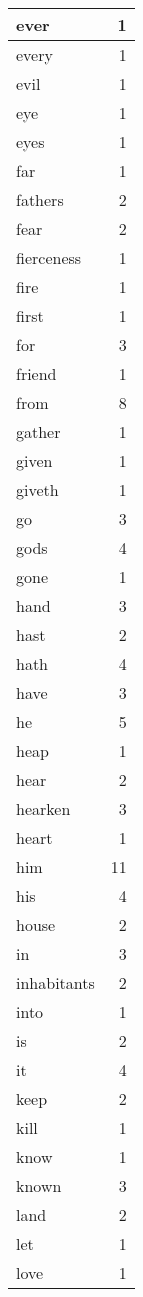 \begin{center}
\begin{longtable}{l|r}
ever & 1 \\ \hline
every & 1 \\ \hline
evil & 1 \\ \hline
eye & 1 \\ \hline
eyes & 1 \\ \hline
far & 1 \\ \hline
fathers & 2 \\ \hline
fear & 2 \\ \hline
fierceness & 1 \\ \hline
fire & 1 \\ \hline
first & 1 \\ \hline
for & 3 \\ \hline
friend & 1 \\ \hline
from & 8 \\ \hline
gather & 1 \\ \hline
given & 1 \\ \hline
giveth & 1 \\ \hline
go & 3 \\ \hline
gods & 4 \\ \hline
gone & 1 \\ \hline
hand & 3 \\ \hline
hast & 2 \\ \hline
hath & 4 \\ \hline
have & 3 \\ \hline
he & 5 \\ \hline
heap & 1 \\ \hline
hear & 2 \\ \hline
hearken & 3 \\ \hline
heart & 1 \\ \hline
him & 11 \\ \hline
his & 4 \\ \hline
house & 2 \\ \hline
in & 3 \\ \hline
inhabitants & 2 \\ \hline
into & 1 \\ \hline
is & 2 \\ \hline
it & 4 \\ \hline
keep & 2 \\ \hline
kill & 1 \\ \hline
know & 1 \\ \hline
known & 3 \\ \hline
land & 2 \\ \hline
let & 1 \\ \hline
love & 1 \\ \hline

\end{longtable}
\end{center}
